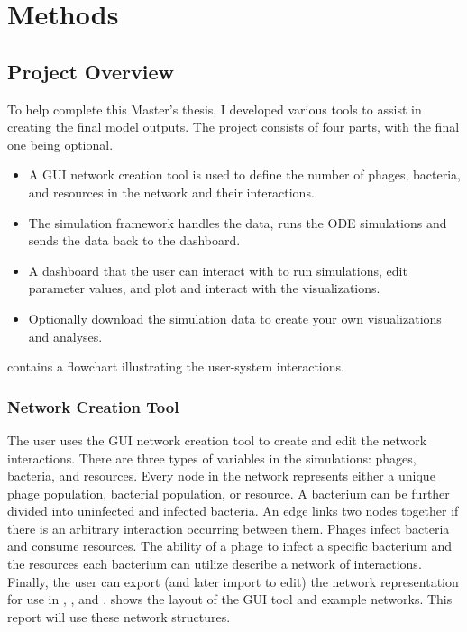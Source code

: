 \chapter{Methods}
\label{Methods}
\section{Project Overview}
To help complete this Master's thesis, I developed various tools to assist in creating the final model outputs.
The project consists of four parts, with the final one being optional. 
\begin{itemize}
    \item A GUI network creation tool is used to define the number of phages, bacteria, and resources in the network and their interactions. 
    \item The simulation framework handles the data, runs the ODE simulations and sends the data back to the dashboard. 
    \item A dashboard that the user can interact with to run simulations, edit parameter values, and plot and interact with the visualizations. 
    \item Optionally download the simulation data to create your own visualizations and analyses. 
\end{itemize}

 contains a flowchart illustrating the user-system interactions. 

\subsection{Network Creation Tool}
\label{sec:network_creation_tool}
The user uses the GUI network creation tool to create and edit the network interactions. 
There are three types of variables in the simulations: phages, bacteria, and resources. 
Every node in the network represents either a unique phage population, bacterial population, or resource. 
A bacterium can be further divided into uninfected and infected bacteria. 
An edge links two nodes together if there is an arbitrary interaction occurring between them. 
Phages infect bacteria and consume resources. 
The ability of a phage to infect a specific bacterium and the resources each bacterium can utilize describe a network of interactions. 
Finally, the user can export (and later import to edit) the network representation for use in , , and . 
 shows the layout of the GUI tool and example networks.
This report will use these network structures. 

